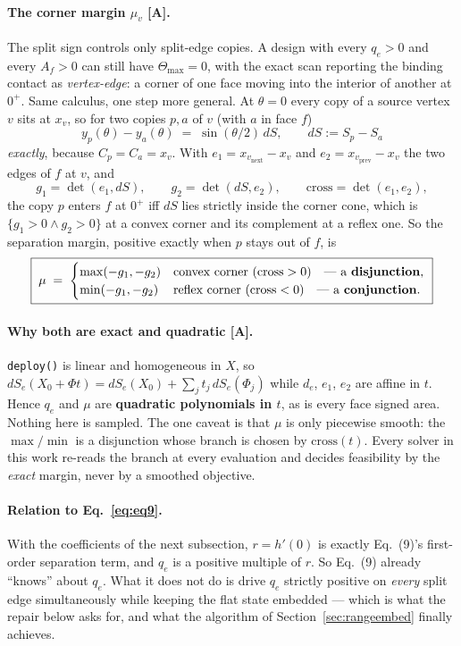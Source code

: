 \documentclass[11pt,a4paper]{article}
\theoremstyle{definition}
\newcommand{\Tmax}{\Theta_{\max}}
\newcommand{\file}[1]{\texttt{\small #1}}
\begin{document}
\paragraph{The corner margin $\mu_v$ [A].} The split sign controls only split-edge copies. A
design with every $q_e>0$ and every $A_f>0$ can still have $\Tmax=0$, with the exact scan
reporting the binding contact as \emph{vertex-edge}: a corner of one face moving into the
interior of another at $0^+$. Same calculus, one step more general. At $\theta=0$ every copy
of a source vertex $v$ sits at $x_v$, so for two copies $p,a$ of $v$ (with $a$ in face $f$)
\[
y_p(\theta)-y_a(\theta) \;=\; \sin(\theta/2)\,dS, \qquad dS:=S_p-S_a
\]
\emph{exactly}, because $C_p=C_a=x_v$. With $e_1 = x_{v_{\mathrm{next}}}-x_v$ and
$e_2 = x_{v_{\mathrm{prev}}}-x_v$ the two edges of $f$ at $v$, and
\[
g_1=\det(e_1,dS), \qquad g_2=\det(dS,e_2), \qquad \mathrm{cross}=\det(e_1,e_2),
\]
the copy $p$ enters $f$ at $0^+$ iff $dS$ lies strictly inside the corner cone, which is
$\{g_1>0 \wedge g_2>0\}$ at a convex corner and its complement at a reflex one. So the
separation margin, positive exactly when $p$ stays out of $f$, is
\begin{equation}
\boxed{\;
\mu \;=\;
\begin{cases}
\max(-g_1,-g_2) & \text{convex corner } (\mathrm{cross}>0)\quad\text{--- a \textbf{disjunction},}\\
\min(-g_1,-g_2) & \text{reflex corner } (\mathrm{cross}<0)\quad\text{--- a \textbf{conjunction}.}
\end{cases}\;}
\label{eq:mu}
\end{equation}

\paragraph{Why both are exact and quadratic [A].} \file{deploy()} is linear and homogeneous
in $X$, so $dS_e(X_0+\Phi t) = dS_e(X_0)+\sum_j t_j\,dS_e(\Phi_j)$ while $d_e$, $e_1$, $e_2$
are affine in $t$. Hence $q_e$ and $\mu$ are \textbf{quadratic polynomials in $t$}, as is
every face signed area. Nothing here is sampled. The one caveat is that $\mu$ is only
piecewise smooth: the $\max/\min$ is a disjunction whose branch is chosen by
$\mathrm{cross}(t)$. Every solver in this work re-reads the branch at every evaluation and
decides feasibility by the \emph{exact} margin, never by a smoothed objective.

\paragraph{Relation to Eq.~\eqref{eq:eq9}.} With the coefficients of the next subsection,
$r=h'(0)$ is exactly Eq.~(9)'s first-order separation term, and $q_e$ is a positive multiple
of $r$. So Eq.~(9) already ``knows'' about $q_e$. What it does not do is drive $q_e$ strictly
positive on \emph{every} split edge simultaneously while keeping the flat state embedded ---
which is what the repair below asks for, and what the algorithm of
Section~\ref{sec:rangeembed} finally achieves.
\end{document}
